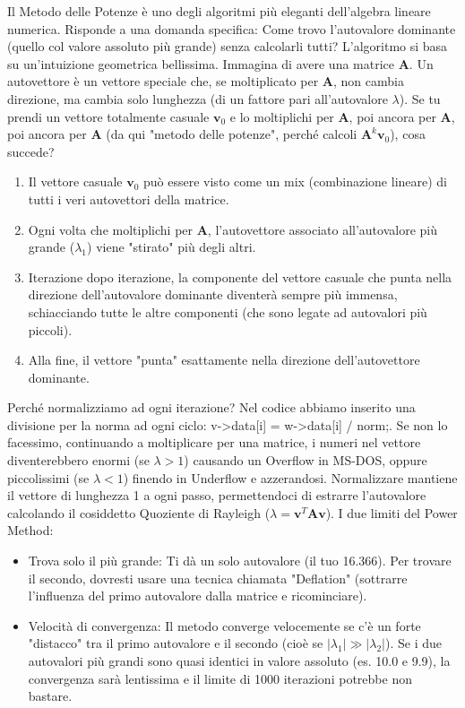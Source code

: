\documentclass[10pt]{article}
\begin{document}
Il Metodo delle Potenze è uno degli algoritmi più eleganti dell'algebra lineare numerica. Risponde a una domanda specifica: Come trovo l'autovalore dominante (quello col valore assoluto più grande) senza calcolarli tutti?
L'algoritmo si basa su un'intuizione geometrica bellissima. Immagina di avere una matrice $\mathbf{A}$. Un autovettore è un vettore speciale che, se moltiplicato per $\mathbf{A}$, non cambia direzione, ma cambia solo lunghezza (di un fattore pari all'autovalore $\lambda$).
Se tu prendi un vettore totalmente casuale $\mathbf{v}_0$ e lo moltiplichi per $\mathbf{A}$, poi ancora per $\mathbf{A}$, poi ancora per $\mathbf{A}$ (da qui "metodo delle potenze", perché calcoli $\mathbf{A}^k \mathbf{v}_0$), cosa succede?
\begin{enumerate}
\item Il vettore casuale $\mathbf{v}_0$ può essere visto come un mix (combinazione lineare) di tutti i veri autovettori della matrice.
\item Ogni volta che moltiplichi per $\mathbf{A}$, l'autovettore associato all'autovalore più grande ($\lambda_1$) viene "stirato" più degli altri.
\item Iterazione dopo iterazione, la componente del vettore casuale che punta nella direzione dell'autovalore dominante diventerà sempre più immensa, schiacciando tutte le altre componenti (che sono legate ad autovalori più piccoli).
\item Alla fine, il vettore "punta" esattamente nella direzione dell'autovettore dominante.
\end{enumerate}
Perché normalizziamo ad ogni iterazione?
Nel codice abbiamo inserito una divisione per la norma ad ogni ciclo: v->data[i] = w->data[i] / norm;.
Se non lo facessimo, continuando a moltiplicare per una matrice, i numeri nel vettore diventerebbero enormi (se $\lambda > 1$) causando un Overflow in MS-DOS, oppure piccolissimi (se $\lambda < 1$) finendo in Underflow e azzerandosi. Normalizzare mantiene il vettore di lunghezza 1 a ogni passo, permettendoci di estrarre l'autovalore calcolando il cosiddetto Quoziente di Rayleigh ($\lambda = \mathbf{v}^T \mathbf{A} \mathbf{v}$).
I due limiti del Power Method:
\begin{itemize}
\item Trova solo il più grande: Ti dà un solo autovalore (il tuo 16.366). Per trovare il secondo, dovresti usare una tecnica chiamata "Deflation" (sottrarre l'influenza del primo autovalore dalla matrice e ricominciare).
\item Velocità di convergenza: Il metodo converge velocemente se c'è un forte "distacco" tra il primo autovalore e il secondo (cioè se $|\lambda_1| \gg |\lambda_2|$). Se i due autovalori più grandi sono quasi identici in valore assoluto (es. 10.0 e 9.9), la convergenza sarà lentissima e il limite di 1000 iterazioni potrebbe non bastare.
\end{itemize}
\end{document}
